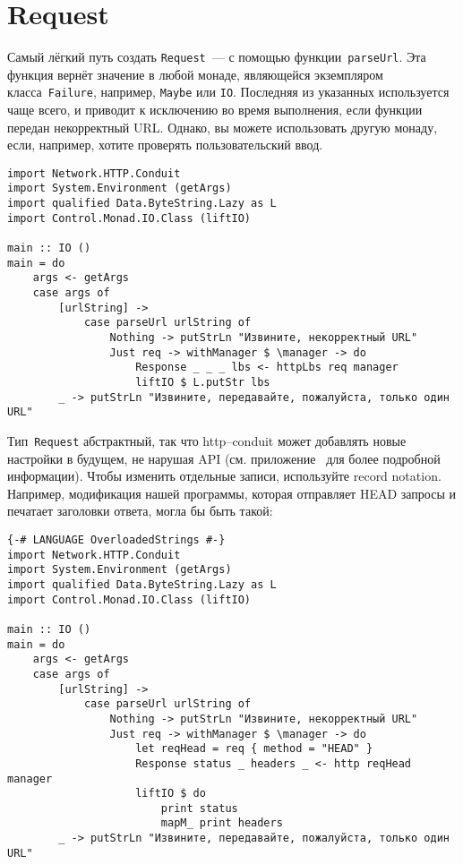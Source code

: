 \section{Request}
Самый лёгкий путь создать \lstinline!Request!~--- с помощью
функции~\lstinline!parseUrl!. Эта функция вернёт значение в любой
монаде, являющейся экземпляром класса~\lstinline!Failure!, например,
\lstinline!Maybe! или \lstinline!IO!. Последняя из указанных
используется чаще всего, и приводит к исключению во время выполнения,
если функции передан некорректный URL. Однако, вы можете использовать
другую монаду, если, например, хотите проверять пользовательский ввод.
\begin{lstlisting}
import Network.HTTP.Conduit
import System.Environment (getArgs)
import qualified Data.ByteString.Lazy as L
import Control.Monad.IO.Class (liftIO)

main :: IO ()
main = do
    args <- getArgs
    case args of
        [urlString] ->
            case parseUrl urlString of
                Nothing -> putStrLn "Извините, некорректный URL"
                Just req -> withManager $ \manager -> do
                    Response _ _ _ lbs <- httpLbs req manager
                    liftIO $ L.putStr lbs
        _ -> putStrLn "Извините, передавайте, пожалуйста, только один URL"
\end{lstlisting}
Тип~\lstinline!Request! абстрактный, так что http--conduit может
добавлять новые настройки в будущем, не нарушая API
(см. приложение~ для более подробной
информации). Чтобы изменить отдельные записи, используйте record
notation. Например, модификация
нашей программы, которая отправляет HEAD запросы и печатает заголовки
ответа, могла бы быть такой:
\begin{lstlisting}
{-# LANGUAGE OverloadedStrings #-}
import Network.HTTP.Conduit
import System.Environment (getArgs)
import qualified Data.ByteString.Lazy as L
import Control.Monad.IO.Class (liftIO)

main :: IO ()
main = do
    args <- getArgs
    case args of
        [urlString] ->
            case parseUrl urlString of
                Nothing -> putStrLn "Извините, некорректный URL"
                Just req -> withManager $ \manager -> do
                    let reqHead = req { method = "HEAD" }
                    Response status _ headers _ <- http reqHead manager
                    liftIO $ do
                        print status
                        mapM_ print headers
        _ -> putStrLn "Извините, передавайте, пожалуйста, только один URL"
\end{lstlisting} %

